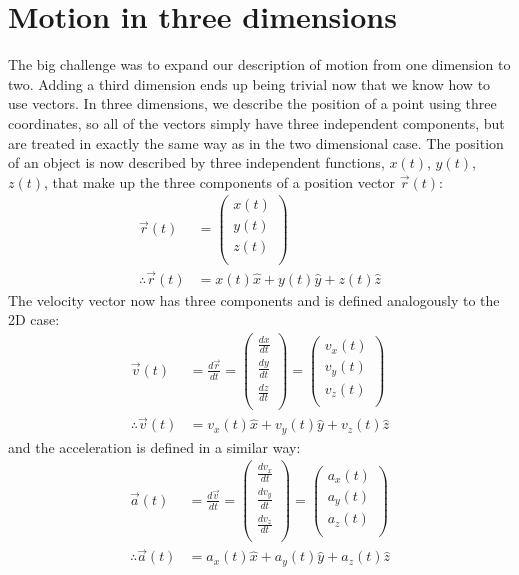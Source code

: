 \section{Motion in three dimensions}
The big challenge was to expand our description of motion from one dimension to two. Adding a third dimension ends up being trivial now that we know how to use vectors. In three dimensions, we describe the position of a point using three coordinates, so all of the vectors simply have three independent components, but are treated in exactly the same way as in the two dimensional case. The position of an object is now described by three independent functions, $x(t)$, $y(t)$, $z(t)$, that make up the three components of a position vector $\vec r(t)$:
\begin{align*}
\vec r(t) &= \begin{pmatrix}
           x(t) \\
           y(t) \\
           z(t)  \\
         \end{pmatrix}\\
\therefore \vec r(t)  &= x(t) \hat x + y(t) \hat y + z(t) \hat z
\end{align*}
The velocity vector now has three components and is defined analogously to the 2D case:
\begin{align*}
\vec v(t) &=\frac{d\vec r}{dt}
 =\begin{pmatrix}
           \frac{dx}{dt}  \\
          \frac{dy}{dt}  \\
          \frac{dz}{dt}  \\
         \end{pmatrix}
 =\begin{pmatrix}
           v_x(t) \\
           v_y(t) \\
           v_z(t) \\
         \end{pmatrix}\\   
\therefore \vec v(t) &= v_x(t)\hat x+v_y(t)\hat y+v_z(t)\hat z  \nonumber 
\end{align*}
and the acceleration is defined in a similar way:
\begin{align*}
\vec a(t)  &=\frac{d\vec v}{dt}
 =\begin{pmatrix}
           \frac{dv_x}{dt}  \\
          \frac{dv_y}{dt}  \\
          \frac{dv_z}{dt}  \\
         \end{pmatrix}
 =\begin{pmatrix}
           a_x(t) \\
           a_y(t) \\
           a_z(t) \\
         \end{pmatrix}\\   
\therefore \vec a(t) &= a_x(t)\hat x+a_y(t)\hat y+a_z(t)\hat z  \nonumber 
\end{align*}

